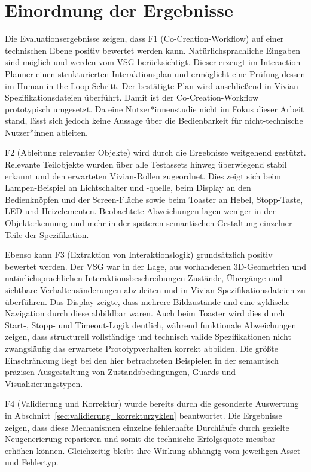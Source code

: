 \section{Einordnung der Ergebnisse}

Die Evaluationsergebnisse zeigen, dass F1 (Co-Creation-Workflow) auf einer technischen Ebene positiv bewertet werden kann. Natürlichsprachliche Eingaben sind möglich und werden vom VSG berücksichtigt. Dieser erzeugt im Interaction Planner einen strukturierten Interaktionsplan und ermöglicht eine Prüfung dessen im Human-in-the-Loop-Schritt. Der bestätigte Plan wird anschließend in Vivian-Spezifikationsdateien überführt. Damit ist der Co-Creation-Workflow prototypisch umgesetzt. Da eine Nutzer*innenstudie nicht im Fokus dieser Arbeit stand, lässt sich jedoch keine Aussage über die Bedienbarkeit für nicht-technische Nutzer*innen ableiten.

F2 (Ableitung relevanter Objekte) wird durch die Ergebnisse weitgehend gestützt. Relevante Teilobjekte wurden über alle Testassets hinweg überwiegend stabil erkannt und den erwarteten Vivian-Rollen zugeordnet. Dies zeigt sich beim Lampen-Beispiel an Lichtschalter und -quelle, beim Display an den Bedienknöpfen und der Screen-Fläche sowie beim Toaster an Hebel, Stopp-Taste, LED und Heizelementen. Beobachtete Abweichungen lagen weniger in der Objekterkennung und mehr in der späteren semantischen Gestaltung einzelner Teile der Spezifikation.

Ebenso kann F3 (Extraktion von Interaktionslogik) grundsätzlich positiv bewertet werden. Der VSG war in der Lage, aus vorhandenen 3D-Geometrien und natürlichsprachlichen Interaktionsbeschreibungen Zustände, Übergänge und sichtbare Verhaltensänderungen abzuleiten und in Vivian-Spezifikationsdateien zu überführen. Das Display zeigte, dass mehrere Bildzustände und eine zyklische Navigation durch diese abbildbar waren. Auch beim Toaster wird dies durch Start-, Stopp- und Timeout-Logik deutlich, während funktionale Abweichungen zeigen, dass strukturell vollständige und technisch valide Spezifikationen nicht zwangsläufig das erwartete Prototypverhalten korrekt abbilden. Die größte Einschränkung liegt bei den hier betrachteten Beispielen in der semantisch präzisen Ausgestaltung von Zustandsbedingungen, Guards und Visualisierungstypen.

F4 (Validierung und Korrektur) wurde bereits durch die gesonderte Auswertung in Abschnitt~\ref{sec:validierung_korrekturzyklen} beantwortet. Die Ergebnisse zeigen, dass diese Mechanismen einzelne fehlerhafte Durchläufe durch gezielte Neugenerierung reparieren und somit die technische Erfolgsquote messbar erhöhen können. Gleichzeitig bleibt ihre Wirkung abhängig vom jeweiligen Asset und Fehlertyp.


